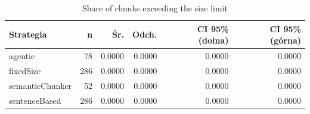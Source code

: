 \begin{table}[H]
    \centering
    \caption{Share of chunks exceeding the size limit}
    \small
    \begin{tabular}{@{}lrrrrr@{}}
        \toprule
        \textbf{Strategia} & \textbf{n} & \textbf{Śr.} & \textbf{Odch.} & \textbf{CI 95\% (dolna)} & \textbf{CI 95\% (górna)} \\
        \midrule
        agentic & 78 & 0.0000 & 0.0000 & 0.0000 & 0.0000 \\
        fixedSize & 286 & 0.0000 & 0.0000 & 0.0000 & 0.0000 \\
        semanticChunker & 52 & 0.0000 & 0.0000 & 0.0000 & 0.0000 \\
        sentenceBased & 286 & 0.0000 & 0.0000 & 0.0000 & 0.0000 \\
        \bottomrule
    \end{tabular}
\end{table}
